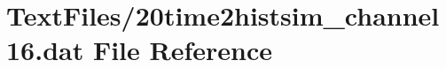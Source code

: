 \hypertarget{20time2histsim__channel16_8dat}{}\section{Text\+Files/20time2histsim\+\_\+channel16.dat File Reference}
\label{20time2histsim__channel16_8dat}

